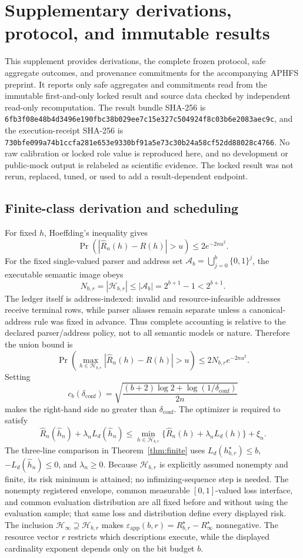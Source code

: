 \section{Supplementary derivations, protocol, and immutable results}
\label{sec:supplement}

This supplement provides derivations, the complete frozen protocol, safe aggregate outcomes, and
provenance commitments for the accompanying APHFS preprint. It reports only safe aggregates and
commitments read from the immutable first-and-only locked result and source data checked by
independent read-only recomputation. The result bundle SHA-256 is
\nolinkurl{6fb3f08e48b4d3496e190fbc38b029ee7c15e327c504924f8c03b6e2083aec9c}, and the
execution-receipt SHA-256 is
\nolinkurl{730bfe099a74b1ccfa281e653e9330bf91a5e73c30b24a58cf52dd88028c4766}.
No raw calibration or locked role value is reproduced here, and no development or public-mock
output is relabeled as scientific evidence. The locked result was not rerun, replaced, tuned, or
used to add a result-dependent endpoint.

\subsection{Finite-class derivation and scheduling}
\label{supp:finite}

For fixed \(h\), Hoeffding's inequality gives \citep{hoeffding1963}
\[
\Pr\!\left(\left|\widehat R_n(h)-R(h)\right|>u\right)
\le 2e^{-2nu^2}.
\]
For the fixed single-valued parser and address set
\(\mathcal A_b=\bigcup_{j=0}^{b}\{0,1\}^j\), the executable semantic image obeys
\[
N_{b,r}=|\mathcal H_{b,r}|\le|\mathcal A_b|=2^{b+1}-1<2^{b+1}.
\]
The ledger itself is address-indexed: invalid and resource-infeasible addresses receive terminal
rows, while parser aliases remain separate unless a canonical-address rule was fixed in advance.
Thus complete accounting is relative to the declared parser/address policy, not to all semantic
models or nature.
Therefore the union bound is
\[
\Pr\!\left(\max_{h\in\mathcal H_{b,r}}
\left|\widehat R_n(h)-R(h)\right|>u\right)
\le 2N_{b,r}e^{-2nu^2}.
\]
Setting
\[
c_b(\delta_{\mathrm{conf}})=
\sqrt{\frac{(b+2)\log2+\log(1/\delta_{\mathrm{conf}})}{2n}}
\]
makes the right-hand side no greater than \(\delta_{\mathrm{conf}}\). The optimizer is required to satisfy
\[
\widehat R_n(\widehat h_n)+\lambda_nL_d(\widehat h_n)
\le \min_{h\in\mathcal H_{b,r}}
\{\widehat R_n(h)+\lambda_nL_d(h)\}+\xi_n.
\]
The three-line comparison in Theorem~\ref{thm:finite} uses \(L_d(h_{b,r}^\star)\le b\),
\(-L_d(\widehat h_n)\le0\), and \(\lambda_n\ge0\). Because
\(\mathcal H_{b,r}\) is explicitly assumed nonempty and finite, its risk minimum is attained;
no infimizing-sequence step is needed. The nonempty registered envelope, common measurable
\([0,1]\)-valued loss interface, and common evaluation distribution are all fixed before and
without using the evaluation sample; that same loss and distribution define every displayed risk. The
inclusion \(\mathcal H_\infty\supseteq\mathcal H_{b,r}\) makes
\(\varepsilon_{\mathrm{app}}(b,r)=R_{b,r}^\star-R_\infty^\star\) nonnegative. The resource vector \(r\)
restricts which descriptions execute, while the displayed cardinality exponent depends only on
the bit budget \(b\).

